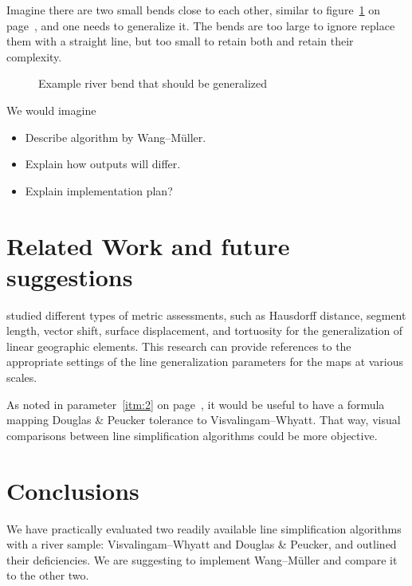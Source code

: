 \documentclass[a4paper]{article}
\newcommand{\DP}{Douglas \& Peucker}
\newcommand{\VW}{Visvalingam--Whyatt}
\newcommand{\WM}{Wang--M{\"u}ller}
\begin{document}
Imagine there are two small bends close to each other, similar to
figure~\ref{pic:example-bend} on page~\pageref{pic:example-bend}, and one needs
to generalize it. The bends are too large to ignore replace them with a
straight line, but too small to retain both and retain their complexity.

\begin{figure}[h]
    \centering
    \caption{Example river bend that should be generalized}
    \label{pic:example-bend}
\end{figure}

We would imagine 

\begin{itemize}
    \item Describe algorithm by {\WM}.
    \item Explain how outputs will differ.
    \item Explain implementation plan?
\end{itemize}

\section{Related Work and future suggestions}
\label{sec:related_work}

\cite{stanislawski2012automated} studied different types of metric assessments,
such as Hausdorff distance, segment length, vector shift, surface displacement,
and tortuosity for the generalization of linear geographic elements. This
research can provide references to the appropriate settings of the line
generalization parameters for the maps at various scales.

As noted in parameter~\ref{itm:2} on page~\pageref{itm:2}, it would be useful
to have a formula mapping {\DP} tolerance to {\VW}. That way, visual
comparisons between line simplification algorithms could be more objective.

\section{Conclusions}
\label{sec:conclusions}

We have practically evaluated two readily available line simplification
algorithms with a river sample: {\VW} and {\DP}, and outlined their
deficiencies. We are suggesting to implement {\WM} and compare it to the other
two.

\printbibliography
\end{document}
